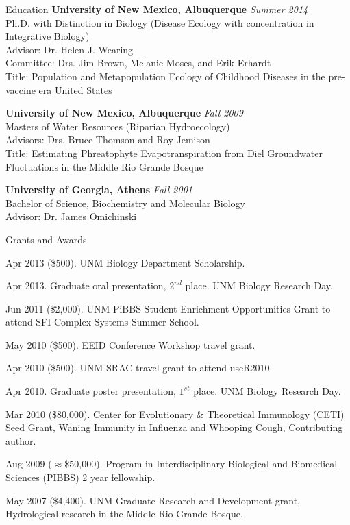 \documentclass{resume} %
\begin{document}
\begin{rSection}{Education}
{\bf University of New Mexico, Albuquerque} \hfill {\em Summer 2014} \\ 
Ph.D. with Distinction in Biology (Disease Ecology with concentration in
Integrative Biology) \\
Advisor: Dr. Helen J. Wearing\\
Committee: Drs. Jim Brown, Melanie Moses, and Erik Erhardt\\
Title: Population and Metapopulation Ecology of
Childhood Diseases in the pre-vaccine era United States

{\bf University of New Mexico, Albuquerque} \hfill {\em Fall 2009} \\ 
Masters of Water Resources (Riparian Hydroecology) \\
Advisors: Drs. Bruce Thomson and Roy Jemison \\
Title: Estimating Phreatophyte Evapotranspiration from Diel Groundwater Fluctuations in the Middle Rio Grande Bosque

{\bf University of Georgia, Athens} \hfill {\em Fall 2001} \\ 
Bachelor of Science, Biochemistry and Molecular Biology \\
Advisor: Dr. James Omichinski
\end{rSection}
\begin{rSection}{Grants and Awards}
\item Apr 2013 (\$500). UNM Biology Department Scholarship.
\item Apr 2013. Graduate oral presentation, $2^{nd}$ place. UNM Biology Research Day.
\item Jun 2011 (\$2,000). UNM PiBBS Student Enrichment Opportunities Grant to
attend SFI Complex Systems Summer School.
\item May 2010 (\$500). EEID Conference Workshop travel grant.
\item Apr 2010 (\$500). UNM SRAC travel grant to attend useR2010.
\item Apr 2010.  Graduate poster presentation, $1^{st}$ place. UNM Biology Research Day.
\item Mar 2010 (\$80,000). Center for Evolutionary \& Theoretical Immunology (CETI) Seed
Grant, Waning Immunity in Influenza and Whooping Cough,
Contributing author.
\item Aug 2009 ($\approx$\$50,000). Program in Interdisciplinary Biological and Biomedical
Sciences (PIBBS) 2 year fellowship.
\item May 2007 (\$4,400). UNM Graduate Research and Development grant, Hydrological
research in the Middle Rio Grande Bosque. 
\end{rSection}
\end{document}
